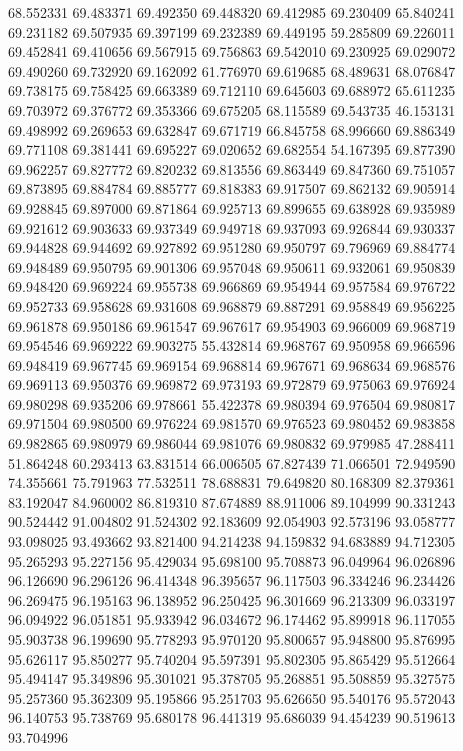 68.552331
69.483371
69.492350
69.448320
69.412985
69.230409
65.840241
69.231182
69.507935
69.397199
69.232389
69.449195
59.285809
69.226011
69.452841
69.410656
69.567915
69.756863
69.542010
69.230925
69.029072
69.490260
69.732920
69.162092
61.776970
69.619685
68.489631
68.076847
69.738175
69.758425
69.663389
69.712110
69.645603
69.688972
65.611235
69.703972
69.376772
69.353366
69.675205
68.115589
69.543735
46.153131
69.498992
69.269653
69.632847
69.671719
66.845758
68.996660
69.886349
69.771108
69.381441
69.695227
69.020652
69.682554
54.167395
69.877390
69.962257
69.827772
69.820232
69.813556
69.863449
69.847360
69.751057
69.873895
69.884784
69.885777
69.818383
69.917507
69.862132
69.905914
69.928845
69.897000
69.871864
69.925713
69.899655
69.638928
69.935989
69.921612
69.903633
69.937349
69.949718
69.937093
69.926844
69.930337
69.944828
69.944692
69.927892
69.951280
69.950797
69.796969
69.884774
69.948489
69.950795
69.901306
69.957048
69.950611
69.932061
69.950839
69.948420
69.969224
69.955738
69.966869
69.954944
69.957584
69.976722
69.952733
69.958628
69.931608
69.968879
69.887291
69.958849
69.956225
69.961878
69.950186
69.961547
69.967617
69.954903
69.966009
69.968719
69.954546
69.969222
69.903275
55.432814
69.968767
69.950958
69.966596
69.948419
69.967745
69.969154
69.968814
69.967671
69.968634
69.968576
69.969113
69.950376
69.969872
69.973193
69.972879
69.975063
69.976924
69.980298
69.935206
69.978661
55.422378
69.980394
69.976504
69.980817
69.971504
69.980500
69.976224
69.981570
69.976523
69.980452
69.983858
69.982865
69.980979
69.986044
69.981076
69.980832
69.979985
47.288411
51.864248
60.293413
63.831514
66.006505
67.827439
71.066501
72.949590
74.355661
75.791963
77.532511
78.688831
79.649820
80.168309
82.379361
83.192047
84.960002
86.819310
87.674889
88.911006
89.104999
90.331243
90.524442
91.004802
91.524302
92.183609
92.054903
92.573196
93.058777
93.098025
93.493662
93.821400
94.214238
94.159832
94.683889
94.712305
95.265293
95.227156
95.429034
95.698100
95.708873
96.049964
96.026896
96.126690
96.296126
96.414348
96.395657
96.117503
96.334246
96.234426
96.269475
96.195163
96.138952
96.250425
96.301669
96.213309
96.033197
96.094922
96.051851
95.933942
96.034672
96.174462
95.899918
96.117055
95.903738
96.199690
95.778293
95.970120
95.800657
95.948800
95.876995
95.626117
95.850277
95.740204
95.597391
95.802305
95.865429
95.512664
95.494147
95.349896
95.301021
95.378705
95.268851
95.508859
95.327575
95.257360
95.362309
95.195866
95.251703
95.626650
95.540176
95.572043
96.140753
95.738769
95.680178
96.441319
95.686039
94.454239
90.519613
93.704996
